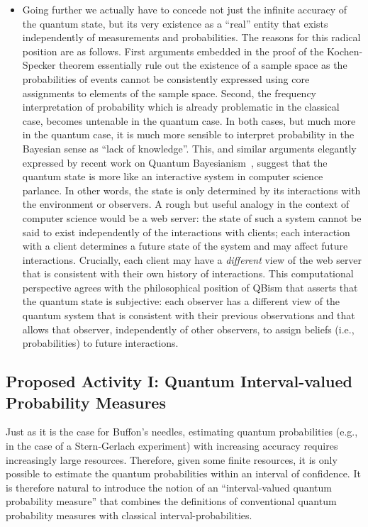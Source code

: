 \documentclass{article}
\theoremstyle{remark}
\begin{document}
\begin{itemize}
\item Going further we actually have to concede not just the infinite
  accuracy of the quantum state, but its very existence as a ``real''
  entity that exists independently of measurements and
  probabilities. The reasons for this radical position are as
  follows. First arguments embedded in the proof of the Kochen-Specker
  theorem essentially rule out the existence of a sample space as the
  probabilities of events cannot be consistently expressed using core
  assignments to elements of the sample space. Second, the frequency
  interpretation of probability which is already problematic in the
  classical case, becomes untenable in the quantum case. In both
  cases, but much more in the quantum case, it is much more sensible
  to interpret probability in the Bayesian sense as ``lack of
  knowledge''. This, and similar arguments elegantly expressed by
  recent work on Quantum Bayesianism~\cite{}, suggest that the quantum
  state is more like an interactive system in computer science
  parlance. In other words, the state is only determined by its
  interactions with the environment or observers. A rough but useful
  analogy in the context of computer science would be a web server:
  the state of such a system cannot be said to exist independently of
  the interactions with clients; each interaction with a client
  determines a future state of the system and may affect future
  interactions. Crucially, each client may have a \emph{different}
  view of the web server that is consistent with their own history of
  interactions. This computational perspective agrees with the
  philosophical position of QBism that asserts that the quantum state
  is subjective: each observer has a different view of the quantum
  system that is consistent with their previous observations and that
  allows that observer, independently of other observers, to assign
  beliefs (i.e., probabilities) to future interactions.

\end{itemize} 

\subsection{Proposed Activity I: Quantum Interval-valued Probability Measures}
 
Just as it is the case for Buffon's needles, estimating quantum
probabilities (e.g., in the case of a Stern-Gerlach experiment) with
increasing accuracy requires increasingly large resources.  Therefore,
given some finite resources, it is only possible to estimate the
quantum probabilities within an interval of confidence. It is
therefore natural to introduce the notion of an ``interval-valued
quantum probability measure'' that combines the definitions of
conventional quantum probability measures with classical
interval-probabilities.
\end{document}
